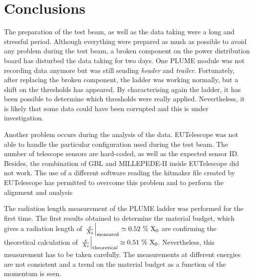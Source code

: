   \section{Conclusions}

  The preparation of the test beam, as well as the data taking were a long and stressful period.
  Although everything were prepared as mush as possible to avoid any problem during the test beam, a broken component on the power distribution board has disturbed the data taking for two days.
  One \gls{PLUME} module was not recording data anymore but was still sending \textit{header} and \textit{trailer}.
  Fortunately, after replacing the broken component, the ladder was working normally, but a shift on the thresholds has appeared.
  By characterising again the ladder, it has been possible to determine which thresholds were really applied. 
  Nevertheless, it is likely that some data could have been corrupted and this is under investigation.

  Another problem occurs during the analysis of the data. 
  EUTelescope was not able to handle the particular configuration used during the test beam.
  The number of telescope sensors are hard-coded, as well as the expected sensor ID.
  Besides, the combination of \gls{GBL} and MILLEPEDE-II inside EUTelescope did not work.
  The use of a different software reading the hitmaker file created by EUTelescope has permitted to overcome this problem and to perform the alignment and analysis 

  The radiation length measurement of the \gls{PLUME} ladder was performed for the first time.
  The first results obtained to determine the material budget, which gives a radiation length of $\left. \frac{x}{X_0} \right|_{\rm{measured}} \simeq 0.52~\%~\rm{X_0}$ are confirming the theoretical calculation of $\left. \frac{x}{X_0}\right|_{\rm{theoretical}} \simeq 0.51~\%~\rm{X_0}$.
  Nevertheless, this measurement has to be taken carefully. 
  The measurements at different energies are not consistent and a trend on the material budget as a function of the momentum is seen.
